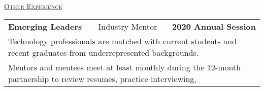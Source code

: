 \documentclass[letterpaper]{article}
\begin{document}
\begin{center}
\begin{tabular}{p{}p{}r}
		\end{tabular} \\
		\vspace{0.25in} %
		\underline{\large \scshape Other Experience}
		\begin{tabular}{p{}p{}r}			
			\\ %
				\textbf{Emerging Leaders}									&
				Industry Mentor										&
				\textbf{2020 Annual Session \quad}
			\\
				\multicolumn{3}{p{\textwidth}}{\quad\quad Technology professionals are matched with current students and recent graduates from underrepresented backgrounds.} 
			\\
				\multicolumn{3}{p{\textwidth}}{\quad\quad Mentors and mentees meet at least monthly during the 12-month partnership to review resumes, practice interviewing,} 

\end{tabular}
\end{center}
\end{document}

